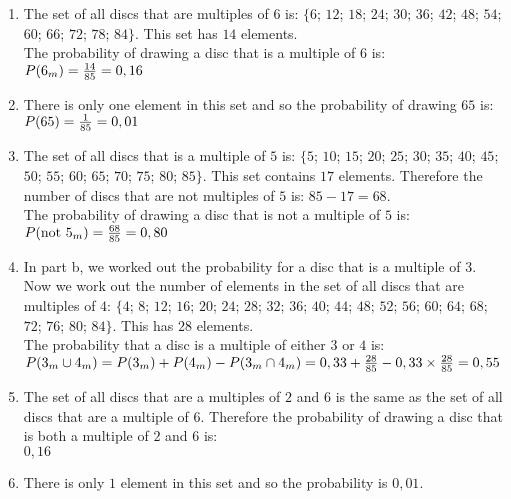 \begin{solutions}{}
{\begin{enumerate}[itemsep=5pt, label=\textbf{\arabic*}. ]
\begin{enumerate}[noitemsep, label=\textbf{(\alph*)} ]
    \item The set of all discs that are multiples of $6$ is: $\{6$; $ 12$; $ 18$; $ 24$; $ 30$; $ 36$; $ 42$; $ 48$; $ 54$; $ 60$; $ 66$; $ 72$; $ 78$; $ 84\}$. This set has $14$ elements.\\
    \newline
    The probability of drawing a disc that is a multiple of $6$ is:\\
    $P(6_m) = \frac{14}{85}\\
	    = 0,16$

    \item There is only one element in this set and so the probability of drawing $65$ is:\\
    $P(65) = \frac{1}{85}\\
	   = 0,01$

    \item The set of all discs that is a multiple of $5$ is: $\{5$; $ 10$; $ 15$; $ 20$; $ 25$; $ 30$; $ 35$; $ 40$; $ 45$; $ 50$; $ 55$; $ 60$; $ 65$; $ 70$; $ 75$; $ 80$; $ 85\}$. This set contains $17$ elements. Therefore the number of discs that are not multiples of $5$ is: $85 − 17 = 68$.\\
   
    The probability of drawing a disc that is not a multiple of $5$ is:\\
    $P(\mbox{not }5_m) = \frac{68}{85}\\
	       = 0,80$

    \item In part b, we worked out the probability for a disc that is a multiple of $3$. Now we work out the number of elements in the set of all discs that are multiples of $4$: $\{4$; $ 8$; $ 12$; $ 16$; $ 20$; $ 24$; $ 28$; $ 32$; $ 36$; $ 40$; $ 44$; $ 48$; $ 52$; $ 56$; $ 60$; $ 64$; $ 68$; $ 72$; $ 76$; $ 80$; $ 84\}$. This has $28$ elements.\\
    
    The probability that a disc is a multiple of either $3$ or $4$ is:\\
    $P(3_m \cup 4_m) = P(3_m) + P(4_m) - P(3_m \cap 4_m)\\
    = 0,33 + \frac{28}{85} - 0,33 \times \frac{28}{85}\\
    = 0,55$
    
    \item The set of all discs that are a multiples of $2$ and $6$ is the same as the set of all discs that are a multiple of $6$. Therefore the probability of drawing a disc that is both a multiple of $2$ and $6$ is:\\
    \newline
    $0,16$
    
    \item There is only $1$ element in this set and so the probability is $0,01$.
    \end{enumerate}

\end{enumerate}}
\end{solutions}


